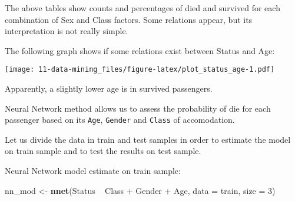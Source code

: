 \documentclass[]{book}
\newenvironment{Shaded}{\begin{snugshade}}{\end{snugshade}}
\newcommand{\KeywordTok}[1]{\textcolor[rgb]{0.13,0.29,0.53}{\textbf{{#1}}}}
\newcommand{\DataTypeTok}[1]{\textcolor[rgb]{0.13,0.29,0.53}{{#1}}}
\newcommand{\DecValTok}[1]{\textcolor[rgb]{0.00,0.00,0.81}{{#1}}}
\newcommand{\FloatTok}[1]{\textcolor[rgb]{0.00,0.00,0.81}{{#1}}}
\newcommand{\StringTok}[1]{\textcolor[rgb]{0.31,0.60,0.02}{{#1}}}
\newcommand{\CommentTok}[1]{\textcolor[rgb]{0.56,0.35,0.01}{\textit{{#1}}}}
\newcommand{\NormalTok}[1]{{#1}}
\begin{document}
The above tables show counts and percentages of died and survived for
each combination of Sex and Class factors. Some relations appear, but
its interpretation is not really simple.

The following graph shows if some relations exist between Status and
Age:

\begin{Shaded}
\end{Shaded}

\texttt{[image: 11-data-mining\_files/figure-latex/plot\_status\_age-1.pdf]}

Apparently, a slightly lower age is in survived passengers.

Neural Network method allows us to assess the probability of die for
each passenger based on its \texttt{Age}, \texttt{Gender} and
\texttt{Class} of accomodation.

Let us divide the data in train and test samples in order to estimate
the model on train sample and to test the results on test sample.

\begin{Shaded}
\end{Shaded}

Neural Network model estimate on train sample:

\begin{Shaded}
\begin{Highlighting}[]
\NormalTok{nn_mod <-}\StringTok{ }\KeywordTok{nnet}\NormalTok{(Status ~}\StringTok{ }\NormalTok{Class +}\StringTok{ }\NormalTok{Gender +}\StringTok{ }\NormalTok{Age, }\DataTypeTok{data =} \NormalTok{train, }\DataTypeTok{size =} \DecValTok{3}\NormalTok{)}
\end{Highlighting}
\end{Shaded}
\end{document}
